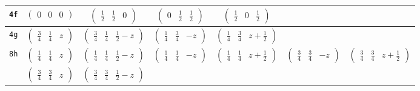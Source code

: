 \documentclass[fleqn,9pt,landscape]{jsarticle}
\begin{document}
\begin{center}
\begin{longtable}{ccccccc}
{\tt 4f} & $ \begin{pmatrix} 0 & 0 & 0 \end{pmatrix} $ & $ \begin{pmatrix} \frac{1}{2} & \frac{1}{2} & 0 \end{pmatrix} $ & $ \begin{pmatrix} 0 & \frac{1}{2} & \frac{1}{2} \end{pmatrix} $ & $ \begin{pmatrix} \frac{1}{2} & 0 & \frac{1}{2} \end{pmatrix} $ & $  $ & $  $ \\ \hline
{\tt 4g} & $ \begin{pmatrix} \frac{3}{4} & \frac{1}{4} & z \end{pmatrix} $ & $ \begin{pmatrix} \frac{3}{4} & \frac{1}{4} & \frac{1}{2} - z \end{pmatrix} $ & $ \begin{pmatrix} \frac{1}{4} & \frac{3}{4} & - z \end{pmatrix} $ & $ \begin{pmatrix} \frac{1}{4} & \frac{3}{4} & z + \frac{1}{2} \end{pmatrix} $ & $  $ & $  $ \\ \hline
{\tt 8h} & $ \begin{pmatrix} \frac{1}{4} & \frac{1}{4} & z \end{pmatrix} $ & $ \begin{pmatrix} \frac{1}{4} & \frac{1}{4} & \frac{1}{2} - z \end{pmatrix} $ & $ \begin{pmatrix} \frac{1}{4} & \frac{1}{4} & - z \end{pmatrix} $ & $ \begin{pmatrix} \frac{1}{4} & \frac{1}{4} & z + \frac{1}{2} \end{pmatrix} $ & $ \begin{pmatrix} \frac{3}{4} & \frac{3}{4} & - z \end{pmatrix} $ & $ \begin{pmatrix} \frac{3}{4} & \frac{3}{4} & z + \frac{1}{2} \end{pmatrix} $ \\
& $ \begin{pmatrix} \frac{3}{4} & \frac{3}{4} & z \end{pmatrix} $ & $ \begin{pmatrix} \frac{3}{4} & \frac{3}{4} & \frac{1}{2} - z \end{pmatrix} $ & $  $ & $  $ & $  $ & $  $ \\ \hline

\end{longtable}
\end{center}
\end{document}
